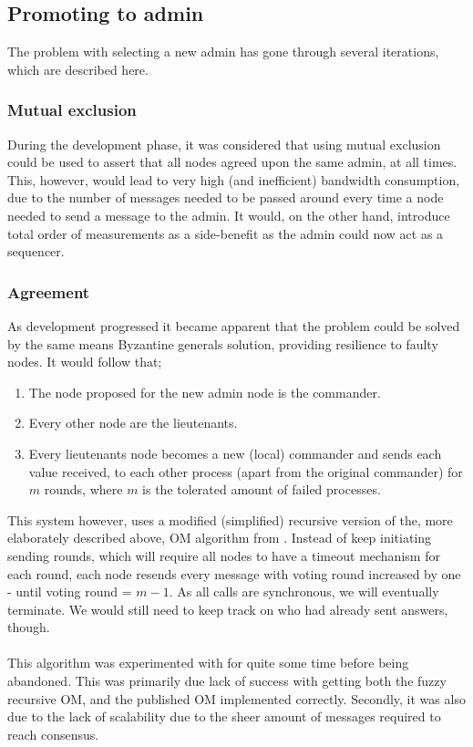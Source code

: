 \documentclass[10pt,a4paper]{article}
\begin{document}
\subsection{Promoting to admin}
\label{sec:admin_promotion}
The problem with selecting a new admin has gone through several iterations, which are described here.
\subsubsection{Mutual exclusion}
During the development phase, it was considered that using mutual exclusion could be used to assert that all nodes agreed upon the same admin, at all times. This, however, would lead to very high (and inefficient) bandwidth consumption, due to the number of messages needed to be passed around every time a node needed to send a message to the admin. It would, on the other hand, introduce total order of measurements as a side-benefit as the admin could now act as a sequencer.

\subsubsection{Agreement}
As development progressed it became apparent that the problem could be solved by the same means Byzantine generals solution, providing resilience to faulty nodes. It would follow that;
\begin{enumerate}
\item The node proposed for the new admin node is the commander.
\item Every other node are the lieutenants.
\item Every lieutenants node becomes a new (local) commander and sends each value received, to each other process (apart from the original commander) for $m$ rounds, where $m$ is the tolerated amount of failed processes.
\end{enumerate}
This system however, uses a modified (simplified) recursive version of the, more elaborately described above, OM algorithm from \cite{lamport1982byzantine}. Instead of keep initiating sending rounds, which will require all nodes to have a timeout mechanism for each round, each node resends every message with voting round increased by one - until voting round = $m-1$. As all calls are synchronous, we will eventually terminate. We would still need to keep track on who had already sent answers, though.\\\\
This algorithm was experimented with for quite some time before being abandoned. This was primarily due lack of success with getting both the fuzzy recursive OM, and the published OM implemented correctly. Secondly, it was also due to the lack of scalability due to the sheer amount of messages required to reach consensus.
\end{document}
